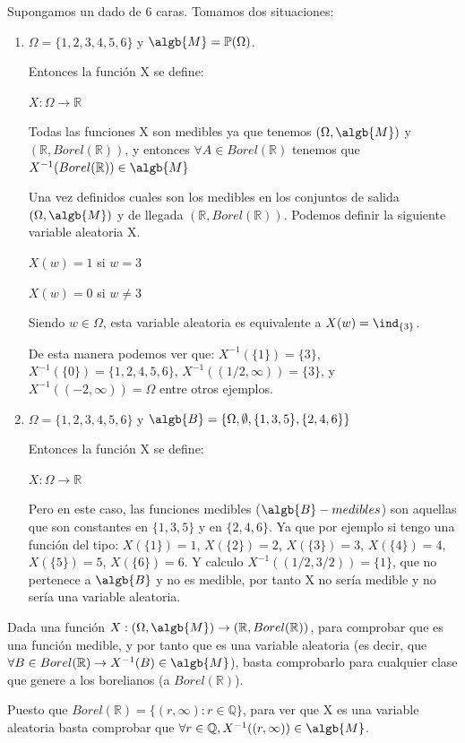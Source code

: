 \documentclass{apuntes}
\begin{document}
\begin{example}
Supongamos un dado de 6 caras. Tomamos dos situaciones:
\begin{enumerate}
\item  $\Omega = \{1,2,3,4,5,6\}$ y $\algb{M}=\mathbb{P}(\Omega)$.

Entonces la función X se define:

$X: \Omega \rightarrow \mathbb{R}$

Todas las funciones X son medibles ya que tenemos $(\Omega,\algb{M})$ y $(\mathbb{R}, Borel(\mathbb{R}))$, y entonces $\forall A \in Borel(\mathbb{R})$ tenemos que $X^{-1}(Borel(\mathbb{R})) \in \algb{M}$

Una vez definidos cuales son los medibles en los conjuntos de salida $(\Omega,\algb{M})$ y de llegada $(\mathbb{R}, Borel(\mathbb{R}))$. Podemos definir la siguiente variable aleatoria X.

$X(w) = 1$ si $w=3$ 

$X(w) = 0$ si $w\neq3$

Siendo $w \in \Omega$, esta variable aleatoria es equivalente a $X(w) = \ind_{\{3\}}$.

De esta manera podemos ver que: $X^{-1}(\{1\}) = \{3\}$, $X^{-1}(\{0\}) = \{1,2,4,5,6\}$, $X^{-1}((1/2,\infty)) = \{3\}$, y $X^{-1}((-2,\infty)) = \Omega$ entre otros ejemplos.


\item $\Omega = \{1,2,3,4,5,6\}$ y $\algb{B} = \{\Omega, \emptyset, \{1,3,5\}, \{2,4,6\} \}$

Entonces la función X se define:

$X: \Omega \rightarrow \mathbb{R}$

Pero en este caso, las funciones medibles ($\algb{B}-medibles$) son aquellas que son constantes en $\{1,3,5\}$ y en $\{2,4,6\}$. Ya que por ejemplo si tengo una función del tipo: $X(\{1\})=1$, $X(\{2\})=2$, $X(\{3\})=3$, $X(\{4\})=4$, $X(\{5\})=5$, $X(\{6\})=6$. Y calculo $X^{-1}((1/2, 3/2))=\{1\}$, que no pertenece a $\algb{B}$ y no es medible, por tanto X no sería medible y no sería una variable aleatoria.
\end{enumerate}

\obs Dada una función $X:(\Omega, \algb{M}) \rightarrow (\mathbb{R}, Borel(\mathbb{R}))$, para comprobar que es una función medible, y por tanto que es una variable aleatoria (es decir, que $\forall B \in Borel(\mathbb{R}) \rightarrow X^{-1}(B) \in \algb{M}$), basta comprobarlo para cualquier clase que genere a los borelianos (a $Borel(\mathbb{R})$).

Puesto que $Borel(\mathbb{R})=\{(r,\infty): r\in \mathbb{Q}\}$, para ver que X es una variable aleatoria basta comprobar que $\forall r \in \mathbb{Q}, X^{-1}((r, \infty)) \in \algb{M}$.

\end{example}
\end{document}
